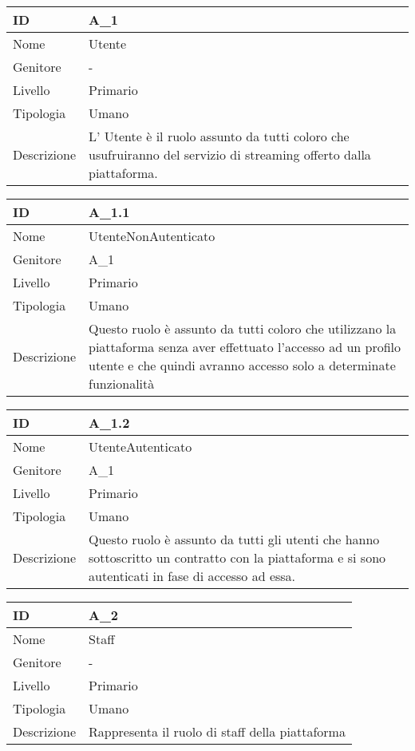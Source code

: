 \begin{center}

\begin{tabular}{ |p{2cm}|p{10cm}|  }
\hline
ID & A\_1 \\\hline
Nome & Utente\\\hline
Genitore & - \\\hline
Livello &  Primario \\\hline
Tipologia & Umano \\\hline
Descrizione &  L' Utente è il ruolo assunto da tutti coloro che usufruiranno del servizio di streaming offerto dalla piattaforma. \\\hline
\end{tabular}
\label{table_attore:1}\newline

\begin{tabular}{ |p{2cm}|p{10cm}|  }
\hline
ID & A\_1.1 \\\hline
Nome & UtenteNonAutenticato\\\hline
Genitore & A\_1 \\\hline
Livello &  Primario \\\hline
Tipologia & Umano \\\hline
Descrizione &  Questo ruolo è assunto da tutti coloro che utilizzano la piattaforma senza aver effettuato l'accesso ad un profilo utente e che quindi avranno accesso solo a determinate funzionalità \\\hline
\end{tabular}
\label{table_attore:1.1}\newline

\begin{tabular}{ |p{2cm}|p{10cm}|  }
\hline
ID & A\_1.2 \\\hline
Nome & UtenteAutenticato\\\hline
Genitore & A\_1 \\\hline
Livello &  Primario \\\hline
Tipologia & Umano \\\hline
Descrizione &  Questo ruolo è assunto da tutti gli utenti che hanno sottoscritto un contratto con la piattaforma e si sono autenticati in fase di accesso ad essa. \\\hline
\end{tabular}
\label{table_attore:1.2}\newline

\begin{tabular}{ |p{2cm}|p{10cm}|  }
\hline
ID & A\_2 \\\hline
Nome & Staff\\\hline
Genitore & -\\\hline
Livello &  Primario \\\hline
Tipologia & Umano \\\hline
Descrizione &  Rappresenta il ruolo di staff della piattaforma \\\hline
\end{tabular}
\label{table_attore:2}\newline


\end{center}
